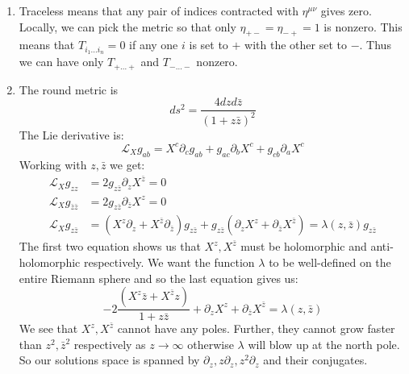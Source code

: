 \documentclass[11pt, class=article, crop=false]{standalone}
\begin{document}
\begin{enumerate}
	 \item Traceless means that any pair of indices contracted with $\eta^{\mu \nu}$ gives zero. Locally, we can pick the metric so that only $\eta_{+-} = \eta_{-+} = 1$ is nonzero. This means that $T_{i_1 \dots i_n} = 0$ if any one $i$ is set to $+$ with the other set to $-$. Thus we can have only $T_{+\dots+}$ and $T_{-\dots-}$ nonzero. 
	 \item The round metric is
	 \[
	 	ds^2 = \frac{4 dz d\bar z}{(1+z \bar z)^2}
	 \]
	 The Lie derivative is:
	 \begin{equation}
	 	\mathcal L_{X} g_{ab} = X^c \partial_c g_{ab} + g_{ac} \partial_b X^c + g_{cb} \partial_a X^c
	 \end{equation}
	 Working with $z, \bar z$ we get:
	 \begin{equation}
		 \begin{aligned}
		 	\mathcal L_{X} g_{zz} &= 2 g_{z \bar z} \partial_z X^{\bar z} = 0 \\
			\mathcal L_{X} g_{\bar z \bar z} &= 2 g_{z \bar z} \partial_{\bar z} X^{z} = 0\\
			\mathcal L_{X} g_{z \bar z} &= (X^z \partial_z + X^{\bar z} \partial_{\bar z} ) g_{z \bar z} + g_{z \bar z} (\partial_z X^z + \partial_{\bar z} X^{\bar z}) = \lambda(z, \bar z) g_{z \bar z}
		 \end{aligned}
	 \end{equation}
	 The first two equation shows us that $X^z, X^{\bar z}$ must be holomorphic and anti-holomorphic respectively. We want the function $\lambda$ to be well-defined on the entire Riemann sphere and so the last equation gives us:
	 \begin{equation}
	 	-2 \frac{ (X^z \bar z + X^{\bar z} z)}{1 + z \bar z} + \partial_z X^z + \partial_{\bar z} X^{\bar z} = \lambda(z, \bar z)
	 \end{equation}
	 We see that $X^z, X^{\bar z}$ cannot have any poles. Further, they cannot grow faster than $z^2, \bar z^2$  respectively as $z \to \infty$ otherwise $\lambda$ will blow up at the north pole. So our solutions space is spanned by $\partial_z, z \partial_z, z^2 \partial_z$ and their conjugates. 
	 

\end{enumerate}
\end{document}
